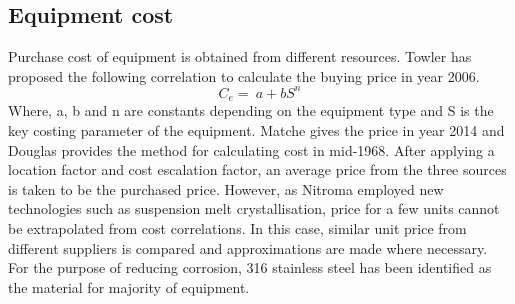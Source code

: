 \subsection{Equipment cost}
Purchase cost of equipment is obtained from different resources. Towler\cite{sinnott_chemical_2020} has proposed the following correlation to calculate the buying price in year 2006.
\begin{equation}
    C_{e}=\ a+bS^n
\end{equation}
Where, a, b and n are constants depending on the equipment type and S is the key costing parameter of the equipment. Matche\cite{noauthor_matches_nodate} gives the price in year 2014 and Douglas\cite{douglas_conceptual_1988} provides the method for calculating cost in mid-1968. After applying a location factor and cost escalation factor, an average price from the three sources is taken to be the purchased price. However, as Nitroma employed new technologies such as suspension melt crystallisation, price for a few units cannot be extrapolated from cost correlations. In this case, similar unit price from different suppliers is compared and approximations are made where necessary. For the purpose of reducing corrosion, 316 stainless steel has been identified as the material for majority of equipment.

